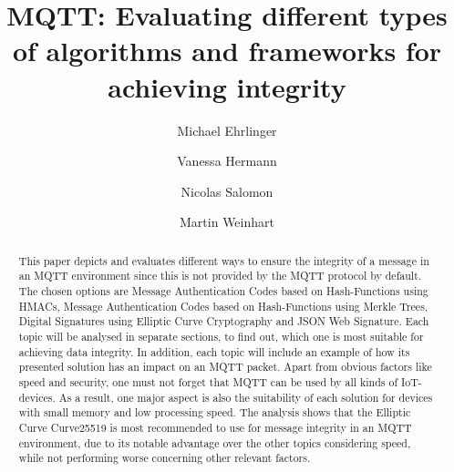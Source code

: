 \documentclass[runningheads]{llncs}
\begin{document}
\title{MQTT: Evaluating different types of algorithms and frameworks for achieving integrity}


\author{Michael Ehrlinger \and Vanessa Hermann \and Nicolas Salomon \and Martin Weinhart}



\maketitle


\begin{abstract}
This paper depicts and evaluates different ways to ensure the integrity of a message in an MQTT environment since this is not provided by the MQTT protocol by default. 
The chosen options are Message Authentication Codes based on Hash-Functions using HMACs, Message Authentication Codes based on Hash-Functions using Merkle Trees, Digital Signatures using Elliptic Curve Cryptography and JSON Web Signature. 
Each topic will be analysed in separate sections, to find out, which one is most suitable for achieving data integrity. 
In addition, each topic will include an example of how its presented solution has an impact on an MQTT packet. 
Apart from obvious factors like speed and security, one must not forget that MQTT can be used by all kinds of IoT-devices. 
As a result, one major aspect is also the suitability of each solution for devices with small memory and low processing speed. 
The analysis shows that the Elliptic Curve Curve25519 is most recommended to use for message integrity in an MQTT environment, due to its notable advantage over the other topics considering speed, while not performing worse concerning other relevant factors.
\newline

\end{abstract}



\newpage








%
%
\newpage


%
\end{document}
